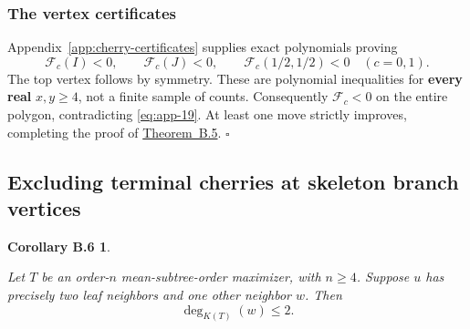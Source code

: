 \documentclass[11pt,letterpaper]{article}
\theoremstyle{plain}
\newtheorem*{appcorollarysix}{Corollary B.6}
\begin{document}
\subsubsection*{The vertex certificates}\label{the-vertex-certificates}

Appendix~\ref{app:cherry-certificates} supplies exact polynomials proving \[
\mathcal F_c(I)<0,\qquad
\mathcal F_c(J)<0,\qquad
\mathcal F_c(1/2,1/2)<0
\quad(c=0,1).
\tag{B.25}\label{eq:app-25}
\] The top vertex follows by symmetry. These are polynomial inequalities for \textbf{every real} \(x,y\ge4\), not a finite sample of counts. Consequently \(\mathcal F_c<0\) on the entire polygon, contradicting \eqref{eq:app-19}. At least one move strictly improves, completing the proof of \hyperref[thm:app-5]{Theorem~B.5}. \hfill\(\square\)

\subsection{Excluding terminal cherries at skeleton branch vertices}\label{b.5.-excluding-terminal-cherries-at-skeleton-branch-vertices}

\begin{appcorollarysix}\label{cor:app-6}

Let \(T\) be an order-\(n\) mean-subtree-order maximizer, with \(n\ge4\). Suppose \(u\) has precisely two leaf neighbors and one other neighbor \(w\). Then \[
\boxed{\deg_{K(T)}(w)\le2.}
\tag{B.26}\label{eq:app-26}
\]

\end{appcorollarysix}
\end{document}
